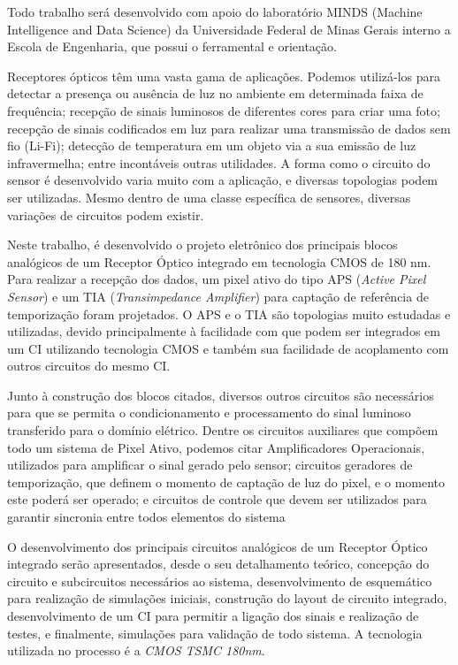 Todo trabalho será desenvolvido com apoio do laboratório MINDS (Machine Intelligence and Data Science) da Universidade Federal de Minas
Gerais interno a Escola de Engenharia, que possui o ferramental e orientação.


Receptores ópticos têm uma vasta gama de aplicações. Podemos utilizá-los para detectar a presença ou ausência de luz no
ambiente em determinada faixa de frequência; recepção de sinais luminosos de diferentes cores para criar uma foto;
recepção de sinais codificados em luz para realizar uma transmissão de dados sem fio (Li-Fi); detecção de temperatura em
um objeto via a sua emissão de luz infravermelha; entre incontáveis outras utilidades. A forma como o circuito do sensor
é desenvolvido varia muito com a aplicação, e diversas topologias podem ser utilizadas. Mesmo dentro de uma classe
específica de sensores, diversas variações de circuitos podem existir.

Neste trabalho, é desenvolvido o projeto eletrônico dos principais blocos analógicos de um Receptor \'Optico integrado
em tecnologia CMOS de 180 nm. Para realizar a recepção dos dados, um pixel ativo do tipo APS (\textit{Active Pixel
Sensor}) e um TIA (\textit{Transimpedance Amplifier}) para captação de refer\^encia de temporização foram projetados. O
APS e o TIA são topologias muito estudadas e utilizadas, devido principalmente à facilidade com que podem ser integrados
em um CI utilizando tecnologia CMOS e também sua facilidade de acoplamento com outros circuitos do mesmo CI. 

Junto à construção dos blocos citados, diversos outros circuitos são necessários para que se permita o condicionamento e
processamento do sinal luminoso transferido para o domínio elétrico. Dentre os circuitos auxiliares que compõem todo um
sistema de Pixel Ativo, podemos citar Amplificadores Operacionais, utilizados para amplificar o sinal gerado pelo
sensor; circuitos geradores de temporização, que definem o momento de captação de luz do pixel, e o momento este poderá
ser operado; e circuitos de controle que devem ser utilizados para garantir sincronia entre todos elementos do sistema

O desenvolvimento dos principais circuitos analógicos de um Receptor Óptico integrado serão apresentados, desde o seu
detalhamento teórico, concepção do circuito e subcircuitos necessários ao sistema, desenvolvimento de esquemático para
realização de simulações iniciais, construção do layout de circuito integrado, desenvolvimento de um CI para permitir a
ligação dos sinais e realização de testes, e finalmente, simulações para validação de todo sistema. A tecnologia
utilizada no processo é a \textit{CMOS TSMC 180nm}.

